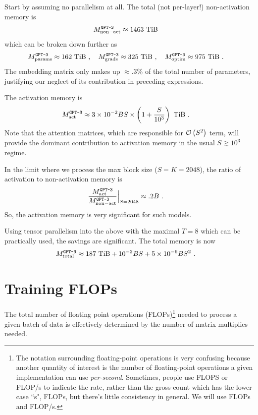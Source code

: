 \documentclass[11pt]{article}
\begin{document}
Start by assuming no parallelism at all. The total (not per-layer!) non-activation memory is
\begin{align}
  M _{ {\rm non-act}  } ^ \texttt{GPT-3} & \approx 1463\ {\rm TiB}
\end{align}
which can be broken down further as
\begin{align}
  M _{ {\rm params}  } ^ \texttt{GPT-3} & \approx 162\ {\rm TiB} \ , \quad
 M _{ {\rm grads}  } ^ \texttt{GPT-3}  \approx 325\ {\rm TiB}\ , \quad
  M _{ {\rm optim}  } ^ \texttt{GPT-3}  \approx 975\ {\rm TiB}\ .
\end{align}
The embedding matrix only makes up $ \approx .3\% $ of the total number of parameters, justifying our
neglect of its contribution in preceding expressions.


The activation memory is
\begin{align}
  M _{ {\rm act}  } ^ \texttt{GPT-3} & \approx 3 \times 10 ^{ -2 }BS\times  \left (  1  + \frac{ S
  }{ 10 ^{ 3 } } \right ) \ {\rm TiB} \ .
\end{align}
Note that the attention matrices, which are responsible for $ \mathcal{O} \left( S ^{ 2 } \right)  $ term, will
provide the dominant contribution to activation memory in the usual $ S \gtrsim 10 ^{ 3 } $ regime.

In the limit where we process the max block size ($ S=K=2048 $), the ratio of activation to
non-activation memory is
\begin{align}
  \frac{  M _{ {\rm act}  } ^ \texttt{GPT-3}}{ M _{ {\rm non-act}  } ^ \texttt{GPT-3} }\Big| _{
  S=2048 } & \approx  .2 B \ .
\end{align}
So, the activation memory is very significant for such models.


Using tensor parallelism into the above with the maximal $ T=8 $ which can be practically used, the
savings are significant. The total memory is now
\begin{align}
  M _{ {\rm total}  } ^{ \texttt{GPT-3}  } & \approx 187\ {\rm TiB} + 10 ^{ -2 }BS + 5 \times 10 ^{
  -6} BS ^{ 2 }\ .
\end{align}




\section{Training FLOPs \label{sec_flops_training} }

The total number of floating point operations (FLOPs)\footnote{The notation surrounding
floating-point operations is very confusing because another quantity of interest is the number
of floating-point operations a given implementation can use \textit{per-second}. Sometimes,
people use FLOPS or FLOP/s to indicate the rate, rather than the gross-count which has the lower
case ``s", FLOPs, but there's little consistency in general. We will use FLOPs and FLOP/s.}  needed to process a given batch of
data is effectively determined by the number of matrix multiplies needed.
\end{document}
